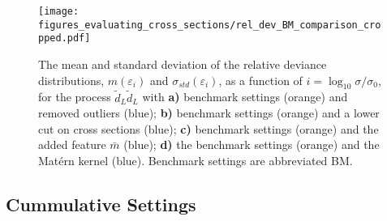 \documentclass[twoside,english]{uiofysmaster}
\begin{document}
\begin{figure}
\centering
\texttt{[image: figures\_evaluating\_cross\_sections/rel\_dev\_BM\_comparison\_cropped.pdf]}
\caption{The mean and standard deviation of the relative deviance distributions, $m(\varepsilon_i)$ and $\sigma_{std}(\varepsilon_i)$, as a function of $i=\log_{10} \sigma/ \sigma_0$, for the process $\tilde{d}_L \tilde{d}_L$ with \textbf{a)} benchmark settings (orange) and removed outliers (blue); \textbf{b)} benchmark settings (orange) and a lower cut on cross sections (blue); \textbf{c)} benchmark settings (orange) and the added feature $\bar{m}$ (blue); \textbf{d)} the benchmark settings (orange) and the Mat\'{e}rn kernel (blue). Benchmark settings are abbreviated BM.}
\label{Fig:: evaluating cross : errors BM dLdL}
\end{figure}


\subsection{Cummulative Settings}\label{Sec:: evaluating cross : Optimal Settings}
\end{document}

